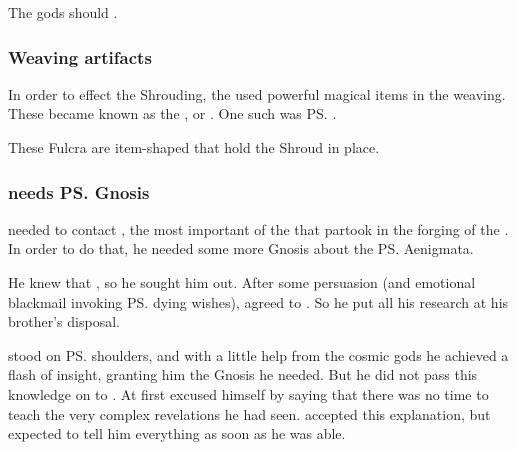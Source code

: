 The gods should . 





\subsubsection{Weaving artifacts}
In order to effect the Shrouding, the \dragons{} used powerful magical items in the weaving. 
These became known as the , or . 
One such was \ps{\Ishnaruchaefir} . 

These Fulcra are item-shaped \vertices{} that hold the Shroud in place. 






\subsubsection{\Ishnaruchaefir{} needs \ps{\Secherdamon} Gnosis}
\Ishnaruchaefir{} needed to contact , the most important of the \xss{} that partook in the forging of the . 
In order to do that, he needed some more Gnosis about the \ps{\xss} Aenigmata. 

He knew that , so he sought him out. 
After some persuasion (and emotional blackmail invoking \ps{\Nexagglachel} dying wishes), \Secherdamon{} agreed to \cooperate. 
So he put all his research at his brother's disposal. 

\Ishnaruchaefir{} stood on \ps{\Secherdamon} shoulders, and with a little help from the cosmic gods he achieved a flash of insight, granting him the Gnosis he needed. 
But he did not pass this knowledge on to \Secherdamon. 
At first \Ishnaruchaefir{} excused himself by saying that there was no time to teach \Secherdamon{} the very complex revelations he had seen.
\Secherdamon{} accepted this explanation, but expected \Ishnaruchaefir{} to tell him everything as soon as he was able. 

